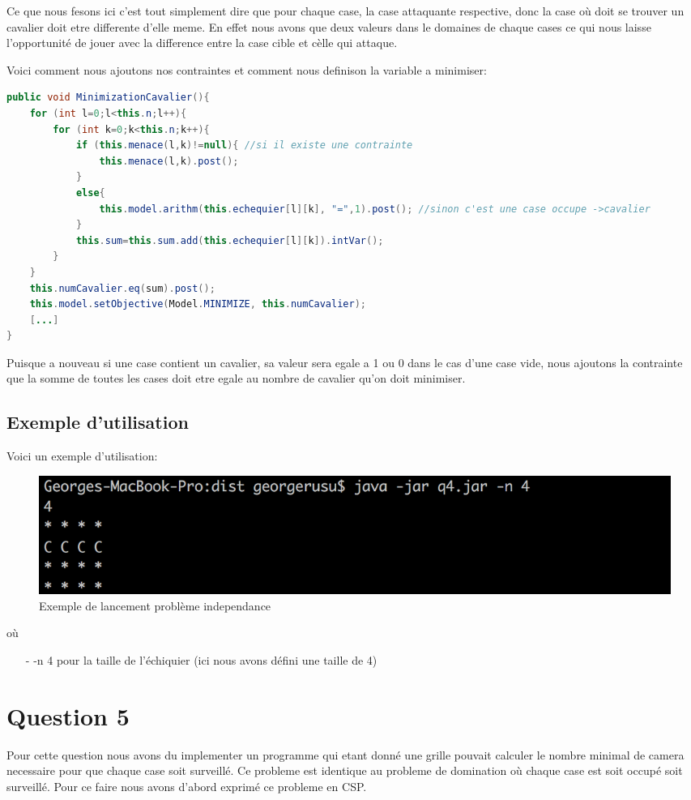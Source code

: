 \documentclass[a4paper,10pt]{article}
\begin{document}
Ce que nous fesons ici c'est tout simplement dire que pour chaque case, la case attaquante respective, donc la case où doit se trouver un cavalier doit etre differente d'elle meme. En effet nous avons que deux valeurs dans le domaines de chaque cases ce qui nous laisse l'opportunité de jouer avec la difference entre la case cible et cèlle qui attaque.

Voici comment nous ajoutons nos contraintes et comment nous definison la variable a minimiser:
\begin{lstlisting}[language=Java,basicstyle=\tiny]
public void MinimizationCavalier(){
	for (int l=0;l<this.n;l++){
		for (int k=0;k<this.n;k++){
			if (this.menace(l,k)!=null){ //si il existe une contrainte
				this.menace(l,k).post();
			}
			else{
				this.model.arithm(this.echequier[l][k], "=",1).post(); //sinon c'est une case occupe ->cavalier
			}
			this.sum=this.sum.add(this.echequier[l][k]).intVar();
		}	
	}
	this.numCavalier.eq(sum).post();
	this.model.setObjective(Model.MINIMIZE, this.numCavalier);
	[...]
}
\end{lstlisting}

Puisque a nouveau si une case contient un cavalier, sa valeur sera egale a 1 ou 0 dans le cas d'une case vide, nous ajoutons la contrainte que la somme de toutes les cases doit etre egale au nombre de cavalier qu'on doit minimiser.

\subsection{Exemple d'utilisation}
Voici un exemple d'utilisation:
\begin{figure}[!h]
  \includegraphics[width=\linewidth]{img/q4.png}
  \caption{Exemple de lancement problème independance}
\end{figure}
\par où
\begin{enumerate}
	\item[-] -n 4 pour la taille de l'échiquier (ici nous avons défini une taille de 4)
\end{enumerate}
\section{Question 5}
\par Pour cette question nous avons du implementer un programme qui etant donné une grille pouvait calculer le nombre minimal de camera necessaire pour que chaque case soit surveillé. Ce probleme est identique au probleme de domination où chaque case est soit occupé soit surveillé. Pour ce faire nous avons d'abord exprimé ce probleme en CSP.
\end{document}
